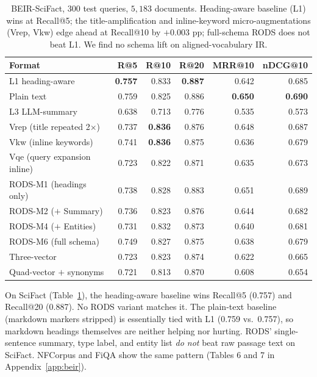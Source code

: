 \documentclass[11pt]{article}
\begin{document}
\begin{table}[t]
\centering
\caption{BEIR-SciFact, $300$ test queries, $5{,}183$ documents.
  Heading-aware baseline (L1) wins at Recall@5; the title-amplification
  and inline-keyword micro-augmentations (Vrep, Vkw) edge ahead at
  Recall@10 by $+0.003$ pp; full-schema RODS does not beat L1.
  We find no schema lift on aligned-vocabulary IR.}
\label{tab:scifact}
\small
\begin{tabular}{lrrrrr}
\toprule
\textbf{Format} & \textbf{R@5} & \textbf{R@10} & \textbf{R@20} & \textbf{MRR@10} & \textbf{nDCG@10} \\
\midrule
\rowcolor{bestcolor!12}
L1 heading-aware              & \textbf{0.757} & 0.833 & \textbf{0.887} & 0.642 & 0.685 \\
Plain text                        & 0.759 & 0.825 & 0.886 & \textbf{0.650} & \textbf{0.690} \\
L3 LLM-summary                & 0.638 & 0.713 & 0.776 & 0.535 & 0.573 \\
\midrule
Vrep (title repeated 2$\times$) & 0.737 & \textbf{0.836} & 0.876 & 0.648 & 0.687 \\
Vkw (inline keywords)         & 0.741 & \textbf{0.836} & 0.875 & 0.636 & 0.679 \\
Vqe (query expansion inline)  & 0.723 & 0.822 & 0.871 & 0.635 & 0.673 \\
\midrule
RODS-M1 (headings only)       & 0.738 & 0.828 & 0.883 & 0.651 & 0.689 \\
RODS-M2 ($+$ Summary)         & 0.736 & 0.823 & 0.876 & 0.644 & 0.682 \\
RODS-M4 ($+$ Entities)        & 0.731 & 0.832 & 0.873 & 0.640 & 0.681 \\
RODS-M6 (full schema)         & 0.749 & 0.827 & 0.875 & 0.638 & 0.679 \\
\midrule
Three-vector                  & 0.723 & 0.823 & 0.874 & 0.622 & 0.665 \\
Quad-vector $+$ synonyms      & 0.721 & 0.813 & 0.870 & 0.608 & 0.654 \\
\bottomrule
\end{tabular}
\end{table}

On SciFact (Table~\ref{tab:scifact}), the heading-aware baseline wins
Recall@5 (0.757) and Recall@20 (0.887). No RODS variant matches it.
The plain-text baseline (markdown markers stripped) is essentially
tied with L1 (0.759 vs.\ 0.757), so markdown headings themselves are
neither helping nor hurting. RODS' single-sentence summary, type
label, and entity list \emph{do not} beat raw passage text on
SciFact. NFCorpus and FiQA show the same pattern (Tables 6 and 7 in
Appendix~\ref{app:beir}).
\end{document}
